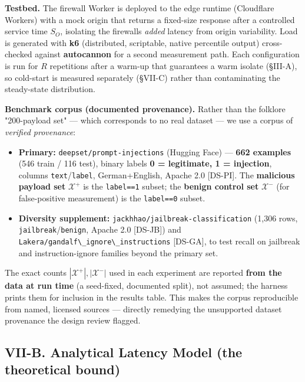 \textbf{Testbed.} The firewall Worker is deployed to the edge runtime
(Cloudflare Workers) with a mock origin that returns a fixed-size
response after a controlled service time \(S_O\), isolating the
firewall\textquotesingle s \emph{added} latency from origin variability.
Load is generated with \textbf{k6} (distributed, scriptable, native
percentile output) cross-checked against \textbf{autocannon} for a
second measurement path. Each configuration is run for \(R\) repetitions
after a warm-up that guarantees a warm isolate (§III-A), so cold-start
is measured separately (§VII-C) rather than contaminating the
steady-state distribution.

\textbf{Benchmark corpus (documented provenance).} Rather than the
folklore "200-payload set" --- which corresponds to no real dataset ---
we use a corpus of \emph{verified provenance}:

\begin{itemize}
\tightlist
\item
  \textbf{Primary:} \passthrough{\lstinline!deepset/prompt-injections!}
  (Hugging Face) --- \textbf{662 examples} (546 train / 116 test),
  binary labels \textbf{0 = legitimate, 1 = injection}, columns
  \passthrough{\lstinline!text!}/\passthrough{\lstinline!label!},
  German+English, Apache 2.0 {[}DS-PI{]}. The \textbf{malicious payload
  set} \(\mathcal{X}^{+}\) is the \passthrough{\lstinline!label==1!}
  subset; the \textbf{benign control set} \(\mathcal{X}^{-}\) (for
  false-positive measurement) is the \passthrough{\lstinline!label==0!}
  subset.
\item
  \textbf{Diversity supplement:}
  \passthrough{\lstinline!jackhhao/jailbreak-classification!} (1,306
  rows,
  \passthrough{\lstinline!jailbreak!}/\passthrough{\lstinline!benign!},
  Apache 2.0 {[}DS-JB{]}) and
  \passthrough{\lstinline!Lakera/gandalf\_ignore\_instructions!}
  {[}DS-GA{]}, to test recall on jailbreak and instruction-ignore
  families beyond the primary set.
\end{itemize}

The exact counts \(|\mathcal{X}^{+}|, |\mathcal{X}^{-}|\) used in each
experiment are reported \textbf{from the data at run time} (a
seed-fixed, documented split), not assumed; the harness prints them for
inclusion in the results table. This makes the corpus reproducible from
named, licensed sources --- directly remedying the unsupported dataset
provenance the design review flagged.

\subsection{VII-B. Analytical Latency Model (the theoretical
bound)}\label{vii-b-analytical-latency-model-the-theoretical-bound}

